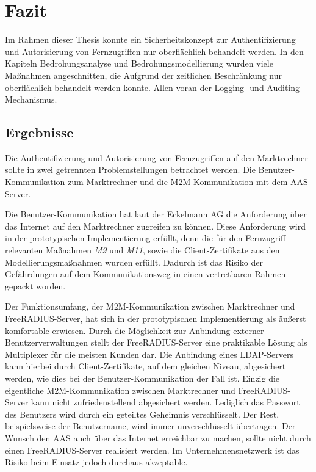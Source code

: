 \documentclass[11pt,a4paper]{report}
\begin{document}
\chapter{Fazit}

Im Rahmen dieser Thesis konnte ein Sicherheitskonzept zur Authentifizierung und Autorisierung von Fernzugriffen nur oberflächlich behandelt werden. In den Kapiteln Bedrohungsanalyse und Bedrohungsmodellierung wurden viele Maßnahmen angeschnitten, die Aufgrund der zeitlichen Beschränkung nur oberflächlich behandelt werden konnte. Allen voran der Logging- und Auditing-Mechanismus.

\section{Ergebnisse}

Die Authentifizierung und Autorisierung von Fernzugriffen auf den Marktrechner sollte in zwei getrennten Problemstellungen betrachtet werden. Die Benutzer-Kommunikation zum Marktrechner und die M2M-Kommunikation mit dem AAS-Server. 

Die Benutzer-Kommunikation hat laut der Eckelmann AG die Anforderung über das Internet auf den Marktrechner zugreifen zu können. Diese Anforderung wird in der prototypischen Implementierung erfüllt, denn die für den Fernzugriff relevanten Maßnahmen \textit{M9} und \textit{M11}, sowie die Client-Zertifikate aus den Modellierungsmaßnahmen wurden erfüllt. Dadurch ist das Risiko der Gefährdungen auf dem Kommunikationsweg in einen vertretbaren Rahmen gepackt worden.

Der Funktionsumfang, der M2M-Kommunikation zwischen Marktrechner und FreeRADIUS-Server, hat sich in der prototypischen Implementierung als äußerst komfortable erwiesen. Durch die Möglichkeit zur Anbindung externer Benutzerverwaltungen stellt der FreeRADIUS-Server eine praktikable Lösung als Multiplexer für die meisten Kunden dar. Die Anbindung eines LDAP-Servers kann hierbei durch Client-Zertifikate, auf dem gleichen Niveau, abgesichert werden, wie dies bei der Benutzer-Kommunikation der Fall ist. Einzig die eigentliche M2M-Kommunikation zwischen Marktrechner und FreeRADIUS-Server kann nicht zufriedenstellend abgesichert werden. Lediglich das Passwort des Benutzers wird durch ein geteiltes Geheimnis verschlüsselt. Der Rest, beispielsweise der Benutzername, wird immer unverschlüsselt übertragen. Der Wunsch den AAS auch über das Internet erreichbar zu machen, sollte nicht durch einen FreeRADIUS-Server realisiert werden. Im Unternehmensnetzwerk ist das Risiko beim Einsatz jedoch durchaus akzeptable.
\end{document}
